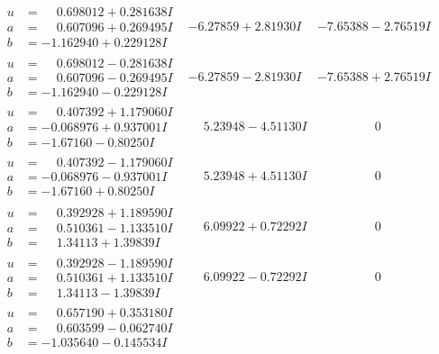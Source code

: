 \documentclass[1p]{elsarticle_modified}
\theoremstyle{definition}
\begin{document}
$$\begin{array}{c|c|c}
\begin{aligned}
u &= \phantom{-}0.698012 + 0.281638 I \\
a &= \phantom{-}0.607096 + 0.269495 I \\
b &= -1.162940 + 0.229128 I\end{aligned}
 & -6.27859 + 2.81930 I & -7.65388 - 2.76519 I \\ \hline\begin{aligned}
u &= \phantom{-}0.698012 - 0.281638 I \\
a &= \phantom{-}0.607096 - 0.269495 I \\
b &= -1.162940 - 0.229128 I\end{aligned}
 & -6.27859 - 2.81930 I & -7.65388 + 2.76519 I \\ \hline\begin{aligned}
u &= \phantom{-}0.407392 + 1.179060 I \\
a &= -0.068976 + 0.937001 I \\
b &= -1.67160 - 0.80250 I\end{aligned}
 & \phantom{-}5.23948 - 4.51130 I & \phantom{-0.000000 } 0 \\ \hline\begin{aligned}
u &= \phantom{-}0.407392 - 1.179060 I \\
a &= -0.068976 - 0.937001 I \\
b &= -1.67160 + 0.80250 I\end{aligned}
 & \phantom{-}5.23948 + 4.51130 I & \phantom{-0.000000 } 0 \\ \hline\begin{aligned}
u &= \phantom{-}0.392928 + 1.189590 I \\
a &= \phantom{-}0.510361 - 1.133510 I \\
b &= \phantom{-}1.34113 + 1.39839 I\end{aligned}
 & \phantom{-}6.09922 + 0.72292 I & \phantom{-0.000000 } 0 \\ \hline\begin{aligned}
u &= \phantom{-}0.392928 - 1.189590 I \\
a &= \phantom{-}0.510361 + 1.133510 I \\
b &= \phantom{-}1.34113 - 1.39839 I\end{aligned}
 & \phantom{-}6.09922 - 0.72292 I & \phantom{-0.000000 } 0 \\ \hline\begin{aligned}
u &= \phantom{-}0.657190 + 0.353180 I \\
a &= \phantom{-}0.603599 - 0.062740 I \\
b &= -1.035640 - 0.145534 I\end{aligned}

\end{array}$$
\end{document}
